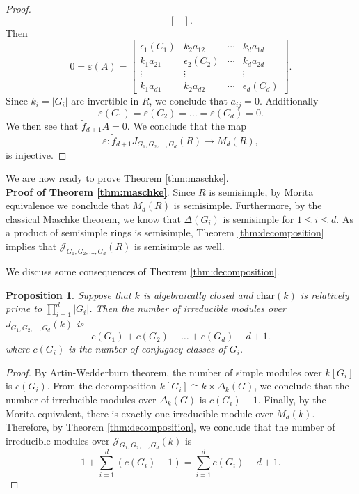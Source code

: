 \documentclass[12pt, a4paper]{amsart}
\numberwithin{equation}{section} %
\theoremstyle{plain}
\theoremstyle{definition}
\theoremstyle{plain}
\newtheorem{prop}[thm]{Proposition}
\theoremstyle{remark}
\newcommand{\sJ}{\mathcal{J}}
\begin{document}
\begin{proof}
\[\begin{bmatrix}
\end{bmatrix}.\]
Then 
\[ 0= \varepsilon(A) 
=\begin{bmatrix} 
\epsilon_1(C_1)&k_2a_{12} &\cdots & k_da_{1d}\\
k_1a_{21} &\epsilon_2(C_2) &\cdots & k_da_{2d}\\
\vdots&\vdots& &\vdots\\
k_1a_{d1}&k_2a_{d2}&\cdots& \epsilon_d(C_d)
\end{bmatrix}.
\]
Since $k_i=|G_i|$ are invertible in $R$, we conclude that $a_{ij}=0.$ Additionally 
\[ \varepsilon(C_1) = \varepsilon(C_2) = \ldots =\varepsilon(C_d) = 0 .\] 
We then see that $\tilde{f}_{d+1}A=0.$ We conclude that the   map 
\[ \varepsilon: \tilde{f}_{d+1} J_{G_1, G_2, \ldots, G_d}(R) \to M_d(R),\] 
is injective. 
\end{proof}

We are now ready to prove Theorem \ref{thm:maschke}. \\ 
\textbf{Proof of Theorem \ref{thm:maschke}}. Since $R$ is semisimple, by Morita equivalence we conclude that $M_d(R)$ is semisimple. Furthermore, by the classical Maschke theorem, we know that $\Delta(G_i)$ is semisimple for $1 \leq i \leq d.$ As a product of semisimple rings is semisimple, Theorem \ref{thm:decomposition} implies that $\sJ_{G_1, G_2, \ldots, G_d}(R)$ is semisimple as well. 


We discuss some consequences of Theorem \ref{thm:decomposition}. 

\begin{prop} \label{prop:number_of_irr_modules}
Suppose that $k$ is algebraically closed and $\text{char}(k)$ is relatively prime to $\prod_{i=1}^d |G_i|$. Then the number of irreducible modules over $J_{G_1, G_2, \ldots, G_d}(k)$ is 
\[ c(G_1)+c(G_2)+\ldots+c(G_d)-d+1 .\] 
where $c(G_i)$ is the number of conjugacy classes of $G_i$.
\end{prop}


\begin{proof}
By Artin-Wedderburn theorem, the number of simple modules over $k[G_i]$ is $c(G_i).$ From the decomposition $k[G_i] \cong k \times \Delta_{k}(G)$, we conclude that the number of irreducible modules over $\Delta_{k}(G)$ is $c(G_i)-1.$ Finally, by the Morita equivalent, there is exactly one irreducible module over $M_d(k)$. Therefore, by Theorem \ref{thm:decomposition}, we conclude that the number of irreducible modules over $\sJ_{G_1, G_2, \ldots, G_d}(k)$ is 
\[ 1+ \sum_{i=1}^d (c(G_i)-1) =\sum_{i=1}^d c(G_i)-d+1 .\] 
\end{proof}
\end{document}
